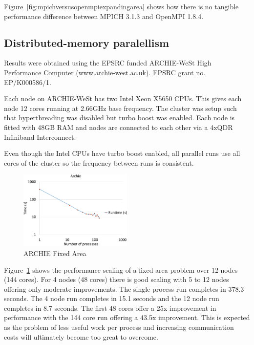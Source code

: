 Figure~\ref{fig:mpichversusopenmpiexpandingarea} shows how there is no tangible
performance difference between MPICH 3.1.3 and OpenMPI 1.8.4.

\subsection{Distributed-memory paralellism}

Results were obtained using the EPSRC funded ARCHIE-WeSt High Performance
Computer (\url{www.archie-west.ac.uk}). EPSRC grant no. EP/K000586/1.

Each node on ARCHIE-WeSt has two Intel Xeon X5650 CPUs. This gives each node 12
cores running at 2.66GHz base frequency. The cluster was setup such that
hyperthreading was disabled but turbo boost was enabled. Each node is fitted
with 48GB RAM and nodes are connected to each other via a 4xQDR Infiniband
Interconnect.

Even though the Intel CPUs have turbo boost enabled, all parallel runs use all
cores of the cluster so the frequency between runs is consistent.

\begin{figure}
    \includegraphics[page=1,width=0.5\textwidth]
    {graphs/ARCHIE-OpenMPI162-GFORTRAN482-default-mapping-fixed-area-crop.pdf}
    \caption{ARCHIE Fixed Area}
    \label{fig:archiefixedarea}
\end{figure}

Figure~\ref{fig:archiefixedarea} shows the performance scaling of a fixed area
problem over 12 nodes (144 cores). For 4 nodes (48 cores) there is good scaling
with 5 to 12 nodes offering only moderate improvements. The single process run
completes in 378.3 seconds. The 4 node run completes in 15.1 seconds and the 12
node run completes in 8.7 seconds. The first 48 cores offer a 25x improvement in
performance with the 144 core run offering a 43.5x improvement. This is expected
as the problem of less useful work per process and increasing communication
costs will ultimately become too great to overcome.

